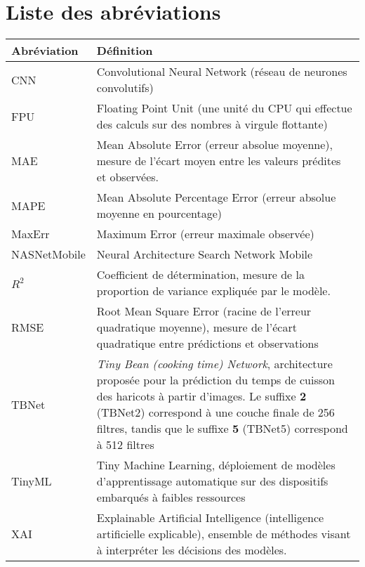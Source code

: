 \chapter*{Liste des abréviations}

\begin{longtable}{|p{3cm}|p{11cm}|}
\hline
\textbf{Abréviation} & \textbf{Définition} \\
\hline
CNN & Convolutional Neural Network (réseau de neurones convolutifs) \\
\hline
FPU & Floating Point Unit (une unité du CPU qui effectue des calculs sur des nombres à virgule flottante) \\
MAE & Mean Absolute Error (erreur absolue moyenne), mesure de l’écart moyen entre les valeurs prédites et observées. \\
\hline

MAPE & Mean Absolute Percentage Error (erreur absolue moyenne en pourcentage) \\
\hline

MaxErr & Maximum Error (erreur maximale observée) \\
\hline

NASNetMobile & Neural Architecture Search Network Mobile \\
\hline

$R^2$ & Coefficient de détermination, mesure de la proportion de variance expliquée par le modèle. \\
\hline

RMSE & Root Mean Square Error (racine de l’erreur quadratique moyenne), mesure de l’écart quadratique entre prédictions et observations \\
\hline

TBNet & \textit{Tiny Bean (cooking time) Network}, architecture proposée pour la prédiction du temps de cuisson des haricots à partir d’images. 
Le suffixe \textbf{2} (TBNet2) correspond à une couche finale de 256 filtres, tandis que le suffixe \textbf{5} (TBNet5) correspond à 512 filtres \\
\hline

TinyML & Tiny Machine Learning, déploiement de modèles d’apprentissage automatique sur des dispositifs embarqués à faibles ressources \\
\hline

XAI & Explainable Artificial Intelligence (intelligence artificielle explicable), ensemble de méthodes visant à interpréter les décisions des modèles. \\
\hline
\end{longtable}
